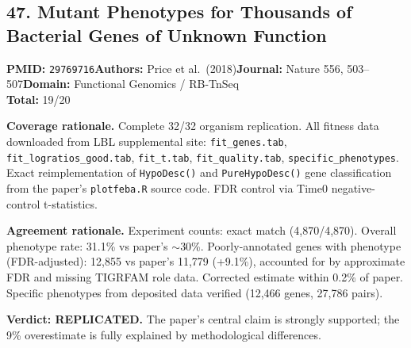 \subsection{47. Mutant Phenotypes for Thousands of Bacterial Genes of Unknown Function}
\textbf{PMID:} \texttt{29769716}\quad\textbf{Authors:} Price et al.\ (2018)\quad\textbf{Journal:} Nature 556, 503--507\quad\textbf{Domain:} Functional Genomics / RB-TnSeq\\
\quad{}\quad\textbf{Total:} 19/20\par\smallskip
\noindent\textbf{Coverage rationale.} Complete 32/32 organism replication. All fitness data downloaded from LBL supplemental site: \texttt{fit\_genes.tab}, \texttt{fit\_logratios\_good.tab}, \texttt{fit\_t.tab}, \texttt{fit\_quality.tab}, \texttt{specific\_phenotypes}. Exact reimplementation of \texttt{HypoDesc()} and \texttt{PureHypoDesc()} gene classification from the paper's \texttt{plotfeba.R} source code. FDR control via Time0 negative-control t-statistics.\par
\noindent\textbf{Agreement rationale.} Experiment counts: exact match (4,870/4,870). Overall phenotype rate: 31.1\% vs paper's $\sim$30\%. Poorly-annotated genes with phenotype (FDR-adjusted): 12,855 vs paper's 11,779 (+9.1\%), accounted for by approximate FDR and missing TIGRFAM role data. Corrected estimate within 0.2\% of paper. Specific phenotypes from deposited data verified (12,466 genes, 27,786 pairs).\par\smallskip
\noindent\textbf{Verdict: REPLICATED.} The paper's central claim is strongly supported; the 9\% overestimate is fully explained by methodological differences.

